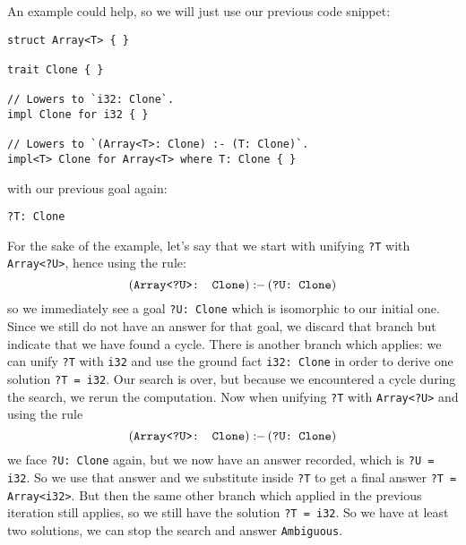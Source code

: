 \documentclass[twocolumn]{article}
\newcommand{\rust}[1]{\texttt{#1}}
\newcommand{\mrust}[1]{\text{\rust{#1}}}
\newcommand{\pif}[0]{:\!\!-\,}
\begin{document}
An example could help, so we will just use our previous code snippet:
\begin{verbatim}
struct Array<T> { }

trait Clone { }

// Lowers to `i32: Clone`.
impl Clone for i32 { }

// Lowers to `(Array<T>: Clone) :- (T: Clone)`.
impl<T> Clone for Array<T> where T: Clone { }
\end{verbatim}
with our previous goal again:
\begin{verbatim}
?T: Clone
\end{verbatim}
For the sake of the example, let's say that we start with unifying \rust{?T} with \rust{Array<?U>}, hence using the rule:
\[
    (\mrust{Array<?U>: Clone}) \pif (\mrust{?U: Clone})
\]
so we immediately see a goal \rust{?U: Clone} which is isomorphic to our initial one. Since we still do not have an answer for that goal, we discard that branch but indicate that we have found a cycle. There is another branch which applies: we can unify \rust{?T} with \rust{i32} and use the ground fact \rust{i32: Clone} in order to derive one solution \rust{?T = i32}. Our search is over, but because we encountered a cycle during the search, we rerun the computation. Now when unifying \rust{?T} with \rust{Array<?U>} and using the rule
\[
    (\mrust{Array<?U>: Clone}) \pif (\mrust{?U: Clone})
\]
we face \rust{?U: Clone} again, but we now have an answer recorded, which is \rust{?U = i32}. So we use that answer and we substitute inside \rust{?T} to get a final answer \rust{?T = Array<i32>}. But then the same other branch which applied in the previous iteration still applies, so we still have the solution \rust{?T = i32}. So we have at least two solutions, we can stop the search and answer \texttt{Ambiguous}.
\end{document}
